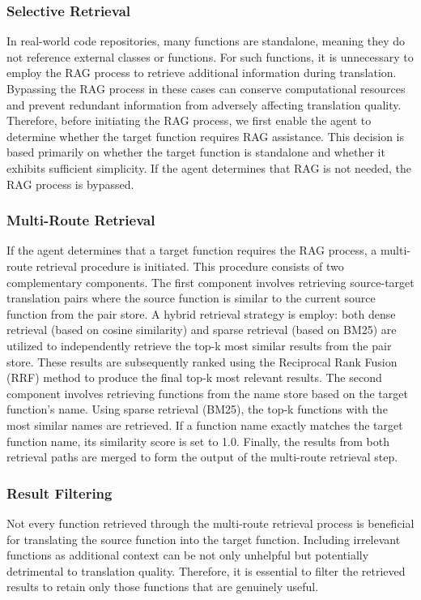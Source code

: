 \subsubsection{Selective Retrieval}
In real-world code repositories, many functions are standalone, meaning they do not reference external classes or functions. For such functions, it is unnecessary to employ the RAG process to retrieve additional information during translation. Bypassing the RAG process in these cases can conserve computational resources and prevent redundant information from adversely affecting translation quality. Therefore, before initiating the RAG process, we first enable the agent to determine whether the target function requires RAG assistance. This decision is based primarily on whether the target function is standalone and whether it exhibits sufficient simplicity. If the agent determines that RAG is not needed, the RAG process is bypassed.

\subsubsection{Multi-Route Retrieval}
If the agent determines that a target function requires the RAG process, a multi-route retrieval procedure is initiated. This procedure consists of two complementary components. The first component involves retrieving source-target translation pairs where the source function is similar to the current source function from the pair store. A hybrid retrieval strategy is employ: both dense retrieval (based on cosine similarity) and sparse retrieval (based on BM25) are utilized to independently retrieve the top-k most similar results from the pair store. These results are subsequently ranked using the Reciprocal Rank Fusion (RRF) method to produce the final top-k most relevant results. The second component involves retrieving functions from the name store based on the target function's name. Using sparse retrieval (BM25), the top-k functions with the most similar names are retrieved. If a function name exactly matches the target function name, its similarity score is set to 1.0. Finally, the results from both retrieval paths are merged to form the output of the multi-route retrieval step.

\subsubsection{Result Filtering}
Not every function retrieved through the multi-route retrieval process is beneficial for translating the source function into the target function. Including irrelevant functions as additional context can be not only unhelpful but potentially detrimental to translation quality. Therefore, it is essential to filter the retrieved results to retain only those functions that are genuinely useful.


